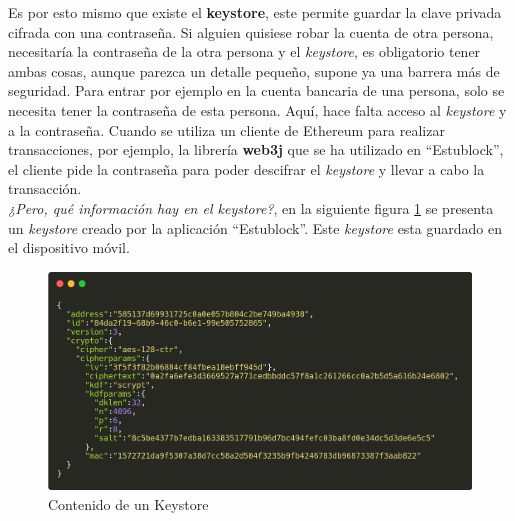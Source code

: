 Es por esto mismo que existe el \textbf{keystore}, este permite guardar la clave privada cifrada con una contraseña. Si alguien quisiese robar la cuenta de otra persona, necesitaría la contraseña de la otra persona y el \emph{keystore}, es obligatorio tener ambas cosas, aunque parezca un detalle pequeño, supone ya una barrera más de seguridad. Para entrar por ejemplo en la cuenta bancaria de una persona, solo se necesita tener la contraseña de esta persona. Aquí, hace falta acceso al \emph{keystore} y a la contraseña. Cuando se utiliza un cliente de Ethereum para realizar transacciones, por ejemplo, la librería \textbf{web3j} que se ha utilizado en ``Estublock'', el cliente pide la contraseña para poder descifrar el \emph{keystore} y llevar a cabo la transacción. \\

\emph{¿Pero, qué información hay en el keystore?}, en la siguiente figura \ref{fig:keystore} se presenta un \emph{keystore} creado por la aplicación ``Estublock''. Este \emph{keystore} esta guardado en el dispositivo móvil. \\
\begin{figure}[h!]
  \centering
  \includegraphics[width=0.8\linewidth]{figs/Desarrollo/Keystore/keystore}
  \caption[Contenido de un Keystore]{Contenido de un Keystore}
  \label{fig:keystore}
\end{figure}

